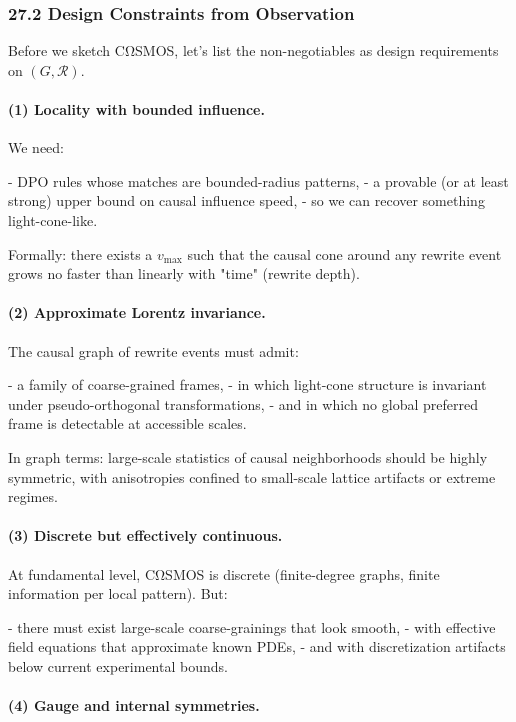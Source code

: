 \subsubsection*{27.2  Design Constraints from Observation}

Before we sketch CΩSMOS, let’s list the non-negotiables as design requirements on $(G,\mathcal{R})$.

\paragraph{(1) Locality with bounded influence.}

We need:

- DPO rules whose matches are bounded-radius patterns,
- a provable (or at least strong) upper bound on causal influence speed,
- so we can recover something light-cone-like.

Formally: there exists a $v_\text{max}$ such that the causal cone around any rewrite event grows no faster than linearly with "time" (rewrite depth).

\paragraph{(2) Approximate Lorentz invariance.}

The causal graph of rewrite events must admit:

- a family of coarse-grained frames,
- in which light-cone structure is invariant under pseudo-orthogonal transformations,
- and in which no global preferred frame is detectable at accessible scales.

In graph terms: large-scale statistics of causal neighborhoods should be highly symmetric, with anisotropies confined to small-scale lattice artifacts or extreme regimes.

\paragraph{(3) Discrete but effectively continuous.}

At fundamental level, CΩSMOS is discrete (finite-degree graphs, finite information per local pattern). But:

- there must exist large-scale coarse-grainings that look smooth,
- with effective field equations that approximate known PDEs,
- and with discretization artifacts below current experimental bounds.

\paragraph{(4) Gauge and internal symmetries.}

